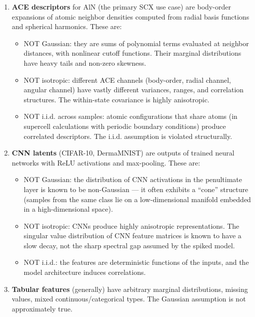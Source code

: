 \documentclass[
  12pt,
]{article}
\providecommand{\tightlist}{%
  \setlength{\itemsep}{0pt}\setlength{\parskip}{0pt}}
\begin{document}
\begin{enumerate}
\def\labelenumi{\arabic{enumi}.}
\tightlist
\item
  \textbf{ACE descriptors} for AlN (the primary SCX use case) are
  body-order expansions of atomic neighbor densities computed from
  radial basis functions and spherical harmonics. These are:

  \begin{itemize}
  \tightlist
  \item
    NOT Gaussian: they are sums of polynomial terms evaluated at
    neighbor distances, with nonlinear cutoff functions. Their marginal
    distributions have heavy tails and non-zero skewness.
  \item
    NOT isotropic: different ACE channels (body-order, radial channel,
    angular channel) have vastly different variances, ranges, and
    correlation structures. The within-state covariance is highly
    anisotropic.
  \item
    NOT i.i.d. across samples: atomic configurations that share atoms
    (in supercell calculations with periodic boundary conditions)
    produce correlated descriptors. The i.i.d. assumption is violated
    structurally.
  \end{itemize}
\item
  \textbf{CNN latents} (CIFAR-10, DermaMNIST) are outputs of trained
  neural networks with ReLU activations and max-pooling. These are:

  \begin{itemize}
  \tightlist
  \item
    NOT Gaussian: the distribution of CNN activations in the penultimate
    layer is known to be non-Gaussian --- it often exhibits a ``cone''
    structure (samples from the same class lie on a low-dimensional
    manifold embedded in a high-dimensional space).
  \item
    NOT isotropic: CNNs produce highly anisotropic representations. The
    singular value distribution of CNN feature matrices is known to have
    a slow decay, not the sharp spectral gap assumed by the spiked
    model.
  \item
    NOT i.i.d.: the features are deterministic functions of the inputs,
    and the model architecture induces correlations.
  \end{itemize}
\item
  \textbf{Tabular features} (generally) have arbitrary marginal
  distributions, missing values, mixed continuous/categorical types. The
  Gaussian assumption is not approximately true.
\end{enumerate}
\end{document}
